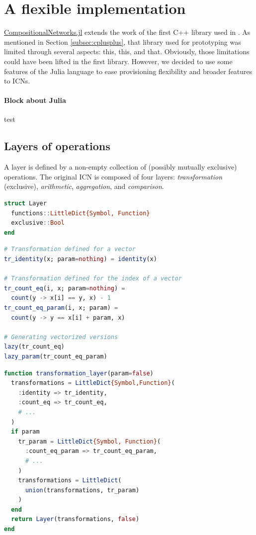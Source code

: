 \documentclass{juliacon}
\newcommand{\cnjl}{\href{https://github.com/JuliaConstraints/CompositionalNetworks.jl}{CompositionalNetworks.jl}\xspace}
\begin{document}
\section{A flexible implementation}
\label{sec:implementation}

\cnjl extends the work of the first C++ library used in \cite{richoux2020automatic}. As mentioned in Section \ref{subsec:cplusplus}, that library used for prototyping was limited through several aspects: this, this, and that. Obviously, those limitations could have been lifted in the first library. However, we decided to use some features of the Julia language to ease provisioning flexibility and broader features to ICNs.

\paragraph*{Block about Julia} test

\subsection{Layers of operations}
\label{subsec:layers}

A layer is defined by a non-empty collection of (possibly mutually exclusive) operations. The original ICN is composed of four layers: \emph{transformation} (exclusive), \emph{arithmetic}, \emph{aggregation}, and \emph{comparison}.

\begin{lstlisting}[language = Julia]
struct Layer
  functions::LittleDict{Symbol, Function}
  exclusive::Bool
end
\end{lstlisting}

\begin{lstlisting}[language = Julia]
# Transformation defined for a vector
tr_identity(x; param=nothing) = identity(x)

# Transformation defined for the index of a vector
tr_count_eq(i, x; param=nothing) =
  count(y -> x[i] == y, x) - 1
tr_count_eq_param(i, x; param) =
  count(y -> y == x[i] + param, x)

# Generating vectorized versions
lazy(tr_count_eq)
lazy_param(tr_count_eq_param)
\end{lstlisting}

\begin{lstlisting}[language = Julia]
function transformation_layer(param=false)
  transformations = LittleDict{Symbol,Function}(
    :identity => tr_identity,
    :count_eq => tr_count_eq,
    # ...
  )
  if param
    tr_param = LittleDict{Symbol, Function}(
      :count_eq_param => tr_count_eq_param,
      # ...
    )
    transformations = LittleDict(
      union(transformations, tr_param)
    )
  end
  return Layer(transformations, false)
end
\end{lstlisting}
\end{document}
